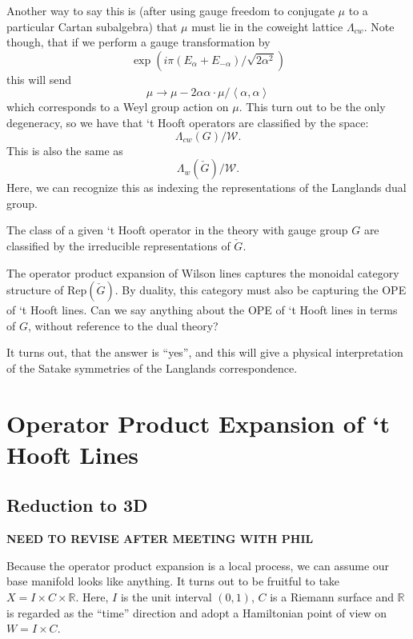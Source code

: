 		Another way to say this is (after using gauge freedom to conjugate $\mu$ to a particular Cartan subalgebra) that $\mu$ must lie in the coweight lattice $\Lambda_{cw}$. Note though, that if we perform a gauge transformation by
		\[
			\exp(i \pi (E_\alpha + E_{-\alpha})/\sqrt{2 \alpha^2})	
		\]
		this will send
		\[
			\mu \to \mu - 2 \alpha \alpha \cdot \mu/\left<\alpha, \alpha\right>
		\]
		which corresponds to a Weyl group action on $\mu$. This turn out to be the only degeneracy, so we have that `t Hooft operators are classified by the space:
		\[
			\Lambda_{cw}(G)/\mathcal W.
		\]
		This is also the same as 
		\[
			\Lambda_{w}(\check G)/\mathcal W.	
		\]
		Here, we can recognize this as indexing the representations of the Langlands dual group. 
		\begin{prop}
			The class of a given `t Hooft operator in the theory with gauge group $G$ are classified by the irreducible representations of $\check G$.
		\end{prop}
		
		The operator product expansion of Wilson lines captures the monoidal category structure of $\mathrm{Rep}(\check G)$. By duality, this category must also be capturing the OPE of `t Hooft lines. Can we say anything about the OPE of `t Hooft lines in terms of $G$, without reference to the dual theory?
		
		It turns out, that the answer is ``yes'', and this will give a physical interpretation of the Satake symmetries of the Langlands correspondence.


	\section{Operator Product Expansion of `t Hooft Lines}
	
	\subsection{Reduction to 3D}
	
	\textbf{NEED TO REVISE AFTER MEETING WITH PHIL}
	
	Because the operator product expansion is a local process, we can assume our base manifold looks like anything. It turns out to be fruitful to take $X = I \times C \times \mathbb R$. Here, $I$ is the unit interval $(0, 1)$, $C$ is a Riemann surface and $\mathbb R$ is regarded as the ``time'' direction and adopt a Hamiltonian point of view on $W = I \times C$. 
	
